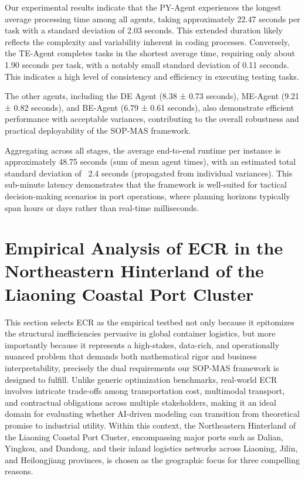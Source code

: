 \documentclass[preprint,12pt]{elsarticle}
\begin{document}
Our experimental results indicate that the PY-Agent experiences the longest average processing time among all agents, taking approximately 22.47 seconds per task with a standard deviation of 2.03 seconds. This extended duration likely reflects the complexity and variability inherent in coding processes. Conversely, the TE-Agent completes tasks in the shortest average time, requiring only about 1.90 seconds per task, with a notably small standard deviation of 0.11 seconds. This indicates a high level of consistency and efficiency in executing testing tasks.

The other agents, including the DE Agent (8.38 ± 0.73 seconds), ME-Agent (9.21 ± 0.82 seconds), and BE-Agent (6.79 ± 0.61 seconds), also demonstrate efficient performance with acceptable variances, contributing to the overall robustness and practical deployability of the SOP-MAS framework.

Aggregating across all stages, the average end-to-end runtime per instance is approximately 48.75 seconds (sum of mean agent times), with an estimated total standard deviation of ~2.4 seconds (propagated from individual variances). This sub-minute latency demonstrates that the framework is well-suited for tactical decision-making scenarios in port operations, where planning horizons typically span hours or days rather than real-time milliseconds.

\section{Empirical Analysis of ECR in the Northeastern Hinterland of the Liaoning Coastal Port Cluster}

This section selects ECR as the empirical testbed not only because it epitomizes the structural inefficiencies pervasive in global container logistics, but more importantly because it represents a high-stakes, data-rich, and operationally nuanced problem that demands both mathematical rigor and business interpretability, precisely the dual requirements our SOP-MAS framework is designed to fulfill. Unlike generic optimization benchmarks, real-world ECR involves intricate trade-offs among transportation cost, multimodal transport, and contractual obligations across multiple stakeholders, making it an ideal domain for evaluating whether AI-driven modeling can transition from theoretical promise to industrial utility. Within this context, the Northeastern Hinterland of the Liaoning Coastal Port Cluster, encompassing major ports such as Dalian, Yingkou, and Dandong, and their inland logistics networks across Liaoning, Jilin, and Heilongjiang provinces, is chosen as the geographic focus for three compelling reasons.
\end{document}
